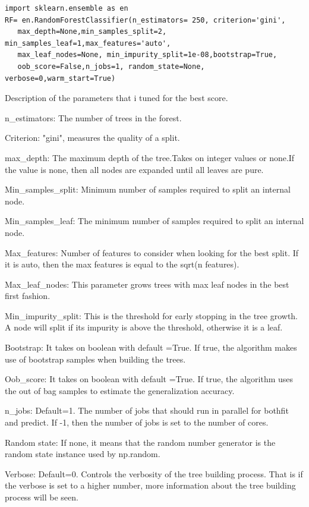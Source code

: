 \begin{enumerate}
\begin{verbatim}
import sklearn.ensemble as en
RF= en.RandomForestClassifier(n_estimators= 250, criterion='gini',
   max_depth=None,min_samples_split=2, min_samples_leaf=1,max_features='auto',   
   max_leaf_nodes=None, min_impurity_split=1e-08,bootstrap=True,            
   oob_score=False,n_jobs=1, random_state=None, verbose=0,warm_start=True)
\end{verbatim}
Description of the parameters that i tuned for the best score.

n\_estimators: The number of trees in the forest.

Criterion: "gini", measures the quality of a split.

max\_depth: The maximum depth of the tree.Takes on integer values or none.If the value is none, then all nodes are expanded until all leaves are pure.

Min\_samples\_split: Minimum number of samples required to split an internal node.

Min\_samples\_leaf: The minimum number of samples required to split an internal node.

Max\_features: Number of features to consider when looking for the best split. If it is auto, then the max features is equal to the sqrt(n features).

Max\_leaf\_nodes: This parameter grows trees with max leaf nodes in the best first fashion.

Min\_impurity\_split: This is the threshold for early stopping in the tree growth. A node will split if its impurity is above the threshold, otherwise it is a leaf.

Bootstrap: It takes on boolean with default =True. If true, the algorithm makes use of bootstrap samples when building the trees.

Oob\_score: It takes on boolean with default =True. If true, the algorithm uses the out of bag samples to estimate the generalization accuracy.

n\_jobs: Default=1. The number of jobs that should run in parallel for bothfit and predict. If -1, then the number of jobs is set to the number of cores.

Random state: If none, it means that the random number generator is the random state instance  used by np.random.

Verbose: Default=0. Controls the verbosity of the tree building process. That is if the verbose is set to a higher number, more information about the tree building process will be seen.


\end{enumerate}
